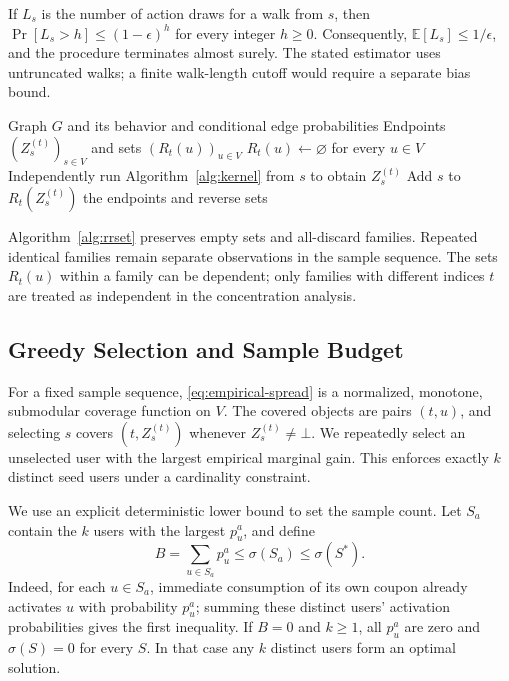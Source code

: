 \documentclass[sigconf]{acmart}
\newcommand{\E}{\mathbb{E}}
\begin{document}
If $L_s$ is the number of action draws for a walk from $s$, then
$\Pr[L_s>h]\leq(1-\epsilon)^h$ for every integer $h\geq0$.
Consequently, $\E[L_s]\leq1/\epsilon$, and the procedure terminates
almost surely. The stated estimator uses untruncated walks; a finite
walk-length cutoff would require a separate bias bound.

\begin{algorithm}[t]
\caption{Generate One Family of Reverse Sets}
\label{alg:rrset}
\begin{algorithmic}[1]
\Require Graph $G$ and its behavior and conditional edge probabilities
\Ensure Endpoints $(Z_s^{(t)})_{s\in V}$ and sets $(R_t(u))_{u\in V}$
\State $R_t(u)\gets\varnothing$ for every $u\in V$
  \State Independently run Algorithm~\ref{alg:kernel} from $s$
    to obtain $Z_s^{(t)}$
    \State Add $s$ to $R_t(Z_s^{(t)})$
  \EndIf
\EndFor
\State \Return the endpoints and reverse sets
\end{algorithmic}
\end{algorithm}

Algorithm~\ref{alg:rrset} preserves empty sets and all-discard families.
Repeated identical families remain separate observations in the sample
sequence. The sets $R_t(u)$ within a family can be dependent; only
families with different indices $t$ are treated as independent in the
concentration analysis.

\subsection{Greedy Selection and Sample Budget}

For a fixed sample sequence, \eqref{eq:empirical-spread} is a normalized,
monotone, submodular coverage function on $V$. The covered objects are
pairs $(t,u)$, and selecting $s$ covers $(t,Z_s^{(t)})$ whenever
$Z_s^{(t)}\ne\bot$. We repeatedly select an unselected user with the
largest empirical marginal gain. This enforces exactly $k$ distinct
seed users under a cardinality constraint.

We use an explicit deterministic lower bound to set the sample count.
Let $S_a$ contain the $k$ users with the largest $p_u^a$, and define
\begin{equation}
\label{eq:opt-lower-bound}
  B=\sum_{u\in S_a}p_u^a\leq\sigma(S_a)\leq\sigma(S^*).
\end{equation}
Indeed, for each $u\in S_a$, immediate consumption of its own coupon
already activates $u$ with probability $p_u^a$; summing these distinct
users' activation probabilities gives the first inequality. If $B=0$
and $k\geq1$, all $p_u^a$ are zero and $\sigma(S)=0$ for every $S$.
In that case any $k$ distinct users form an optimal solution.
\end{document}
